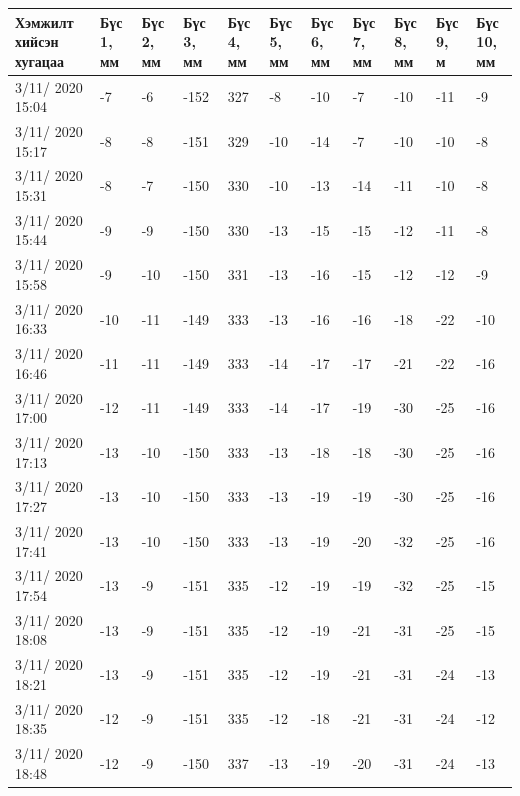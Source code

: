 \begin{table}[h]
    \centering
    \begin{tabular}{|p{1.5cm}|p{0.8cm}|p{0.8cm}|p{0.8cm}|p{0.8cm}|p{0.8cm}|p{0.8cm}|p{0.8cm}|p{0.8cm}|p{0.8cm}|p{0.8cm}|}
         \hline
     Хэмжилт хийсэн хугацаа & Бүс 1, мм&	Бүс 2, мм&	Бүс 3, мм&	Бүс 4, мм&	Бүс 5, мм&	Бүс 6, мм&	Бүс 7, мм&	Бүс 8, мм&	Бүс 9, м&	Бүс 10, мм \\ \hline
3/11/ 2020 15:04&	-7&	-6&	-152&327&-8&	-10&-7&	-10&-11&	-9 \\ \hline
3/11/ 2020 15:17&	-8&	-8&	-151&329&-10&	-14&-7&	-10&-10&	-8 \\ \hline
3/11/ 2020 15:31&	-8&	-7&	-150&330&-10&	-13&-14&-11&-10&	-8 \\ \hline
3/11/ 2020 15:44&	-9&	-9&	-150&330&-13&	-15&-15&-12&-11&	-8 \\ \hline
3/11/ 2020 15:58&	-9&	-10&-150&331&-13&	-16&-15&-12&-12&	-9 \\ \hline
3/11/ 2020 16:33&	-10&-11&-149&333&-13&	-16&-16&-18&-22&	-10 \\ \hline
3/11/ 2020 16:46&	-11&-11&-149&333&-14&	-17&-17&-21&-22&	-16 \\ \hline
3/11/ 2020 17:00&	-12&-11&-149&333&-14&	-17&-19&-30&-25&	-16 \\ \hline
3/11/ 2020 17:13&	-13&-10&-150&333&-13&	-18&-18&-30&-25&	-16 \\ \hline
3/11/ 2020 17:27&	-13&-10&-150&333&-13&	-19&-19&-30&-25&	-16 \\ \hline
3/11/ 2020 17:41&	-13&-10&-150&333&-13&	-19&-20&-32&-25&	-16 \\ \hline
3/11/ 2020 17:54&	-13&-9&	-151&335&-12&	-19&-19&-32&-25&	-15 \\ \hline
3/11/ 2020 18:08&	-13&-9&	-151&335&-12&	-19&-21&-31&-25&	-15 \\ \hline
3/11/ 2020 18:21&	-13&-9&	-151&335&-12&	-19&-21&-31&-24&	-13 \\ \hline
3/11/ 2020 18:35&	-12&-9&	-151&335&-12&	-18&-21&-31&-24&	-12 \\ \hline
3/11/ 2020 18:48&	-12&-9&	-150&337&-13&	-19&-20&-31&-24&	-13 \\ \hline
    \end{tabular}
\end{table}
